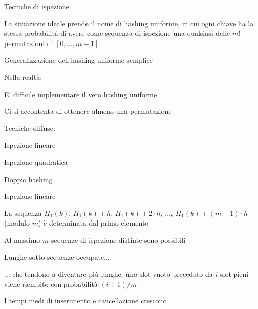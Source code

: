 \begin{frame}{Tecniche di ispezione}

\vspace{-6pt}
\begin{myboxtitle}
La situazione ideale prende il nome di \alert{hashing uniforme}, in cui
ogni chiave ha la stessa probabilità di avere come sequenza di ispezione
una qualsiasi delle $m!$ permutazioni di $[0, \ldots, m-1]$.
\end{myboxtitle}

\BIL
\item Generalizzazione dell'hashing uniforme semplice
\item Nella realtà:
\BI
\item E' difficile implementare il vero hashing uniforme
\item Ci si accontenta di ottenere almeno una permutazione
\EI
\item Tecniche diffuse:
\BI
\item \alert{Ispezione lineare}
\item \alert{Ispezione quadratica}
\item \alert{Doppio hashing}
\EI
\EIL

\end{frame}

\begin{frame}{Ispezione lineare}
	
\vspace{-6pt}

\BIL
\item La sequenza $H_1(k)$, $H_1(k)+h$, $H_1(k)+2 \cdot h$, $\ldots$, $H_1(k)+(m-1) \cdot h$ 
(modulo $m$) è determinata dal primo elemento
\item Al massimo $m$ sequenze di ispezione distinte sono possibili
\EIL

\begin{myboxtitle}
\BI
\item Lunghe sotto-sequenze occupate...
\item ... che tendono a diventare più lunghe: uno slot vuoto preceduto da $i$ 
slot pieni viene riempito con probabilità $(i+1)/m$
\item I tempi medi di inserimento e cancellazione crescono	
\EI
\end{myboxtitle}
\end{frame}

